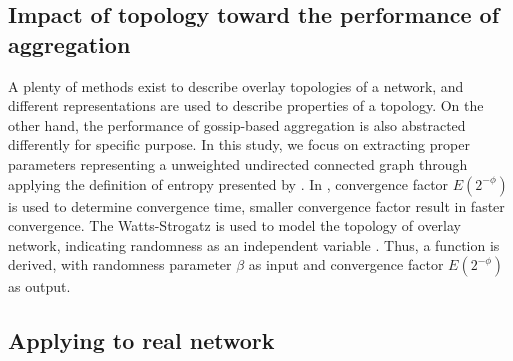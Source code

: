 \documentclass[11pt,a4paper]{article}
\begin{document}
\subsection{Impact of topology toward the performance of aggregation}
A plenty of methods exist to describe overlay topologies of a network, and different representations are used to describe properties of a topology. On the other hand, the performance of gossip-based aggregation is also abstracted differently for specific purpose.
In this study, we focus on extracting proper parameters representing a unweighted undirected connected graph through applying the definition of entropy presented by \cite{0256-307X-25-11-093}. 
In \cite{jelasity_gossip-based_2005}, convergence factor $E(2^{-\phi})$ is used to determine convergence time, smaller convergence factor result in faster convergence. The Watts-Strogatz is used to model the topology of overlay network, indicating randomness as an independent variable \cite{Watts1998}. Thus, a function is derived, with randomness parameter $\beta$ as input and convergence factor $E(2^{-\phi})$ as output.


\subsection{Applying to real network}
\end{document}
